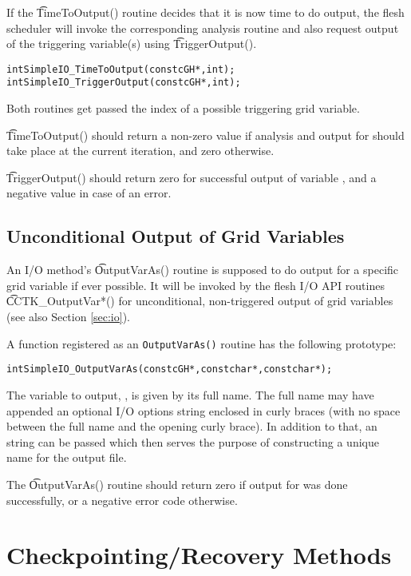 If the {\t TimeToOutput()} routine decides that it is now time to do output, the
flesh scheduler will invoke the corresponding analysis routine and also request
output of the triggering variable(s) using {\t TriggerOutput()}.
%
\begin{alltt}
  int SimpleIO_TimeToOutput (const cGH *, int );
  int SimpleIO_TriggerOutput (const cGH *, int );
\end{alltt}
%
Both routines get passed the index of a possible triggering grid variable.

{\t TimeToOutput()} should return a non-zero value if analysis and output
for \texttt{} should take place at the current iteration, and zero
otherwise.

{\t TriggerOutput()} should return zero for successful output of variable
\texttt{}, and a negative value in case of an error.
%
%
\subsection{Unconditional Output of Grid Variables}

An I/O method's {\t OutputVarAs()} routine is supposed to do output for a
specific grid variable if ever possible. It will be invoked by the flesh I/O API
routines {\t CCTK\_OutputVar*()} for unconditional, non-triggered output of
grid variables (see also Section \ref{sec:io}).

A function registered as an \texttt{OutputVarAs()} routine has the following
prototype:
%
\begin{alltt}
  int SimpleIO_OutputVarAs (const cGH *, const char *, const char *);
\end{alltt}
%
The variable to output, \texttt{}, is given by its full name.
The full name may have appended an optional I/O options string enclosed in
curly braces (with no space between the full name and the opening curly brace).
In addition to that, an \texttt{} string can be passed which then
serves the purpose of constructing a unique name for the output file.

The {\t OutputVarAs()} routine should return zero if output for
\texttt{}
was done successfully, or a negative error code otherwise.


\section{Checkpointing/Recovery Methods}
\label{chap:cp_recovery_methods}

